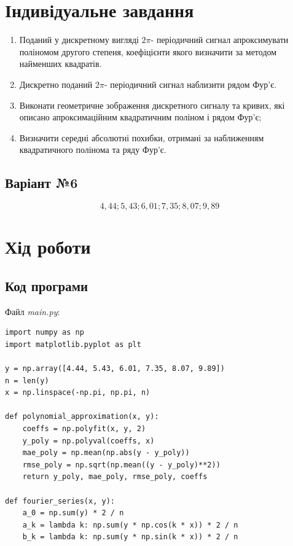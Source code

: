 \documentclass[oneside,14pt]{extarticle}
\begin{document}
\begin{normalsize}
	\section*{Індивідуальне завдання}
	\begin{enumerate}
		\item Поданий у дискретному вигляді $2\pi$- періодичний сигнал апроксимувати
поліномом другого степеня, коефіцієнти якого визначити за методом найменших
квадратів.
		\item Дискретно поданий $2\pi$- періодичний сигнал наблизити рядом Фур’є.
		\item Виконати геометричне зображення дискретного сигналу та кривих, які
описано апроксимаційним квадратичним поліном і рядом Фур’є;
		\item Визначити середні абсолютні похибки, отримані за наближенням
квадратичного полінома та ряду Фур’є.
	\end{enumerate}
	
	\subsection*{Варіант №6}
	
	\begin{equation}
		4,44; 5,43; 6,01; 7,35; 8,07; 9,89\nonumber
	\end{equation}
	
	\section*{Хід роботи}	

	\subsection*{Код програми}
	Файл \textit{main.py}:
	{\small
		\begin{lstlisting}
import numpy as np
import matplotlib.pyplot as plt

y = np.array([4.44, 5.43, 6.01, 7.35, 8.07, 9.89])
n = len(y)
x = np.linspace(-np.pi, np.pi, n)

def polynomial_approximation(x, y):
    coeffs = np.polyfit(x, y, 2)
    y_poly = np.polyval(coeffs, x)
    mae_poly = np.mean(np.abs(y - y_poly))
    rmse_poly = np.sqrt(np.mean((y - y_poly)**2))
    return y_poly, mae_poly, rmse_poly, coeffs

def fourier_series(x, y):
    a_0 = np.sum(y) * 2 / n
    a_k = lambda k: np.sum(y * np.cos(k * x)) * 2 / n
    b_k = lambda k: np.sum(y * np.sin(k * x)) * 2 / n
    

\end{lstlisting}}
\end{normalsize}
\end{document}
